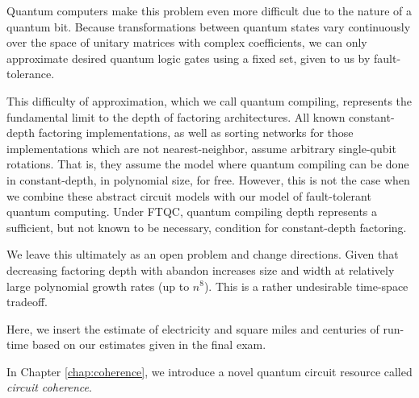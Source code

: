 Quantum computers make this problem even more difficult due to the nature of a quantum bit. Because transformations between quantum states vary continuously over the space of unitary matrices with complex coefficients, we can only approximate desired quantum logic gates using a fixed set, given to us by fault-tolerance.

This difficulty of approximation, which we call quantum compiling, represents the fundamental limit to the depth of factoring architectures. All known constant-depth factoring implementations, as well as sorting networks for those implementations which are not nearest-neighbor, assume arbitrary single-qubit rotations. That is, they assume the model where quantum compiling can be done in constant-depth, in polynomial size, for free. However, this is not the case when we combine these abstract circuit models with our model of fault-tolerant quantum computing. Under FTQC, quantum compiling depth represents a sufficient, but not known to be necessary, condition for constant-depth factoring. 

We leave this ultimately as an open problem and change directions.
Given that decreasing factoring depth with abandon increases size and width at relatively large polynomial growth rates (up to $n^8$). This is a rather undesirable time-space tradeoff.

Here, we insert the estimate of electricity and square miles and centuries of run-time based on our estimates given in the final exam.

In Chapter \ref{chap:coherence}, we introduce a novel quantum circuit resource called \emph{circuit coherence}.